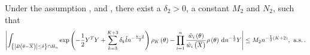 \begin{lem}
\label{lem:central-expansion-post-prod}%
\begin{comment}
need change the subscript of N, M, C
\end{comment}
Under the assumption , 
and , there exist a $\delta_{2}>0$, a constant
$M_{2}$ and $N_{2}$, such that 
\begin{equation}
\left|\int_{\left\{ \left|B\left(\theta-\overline{X}\right)\right|\le\delta\right\} \cap H_{n}}\exp\left(-\frac{1}{2}Y^{T}Y+\sum_{k=3}^{K+3}\delta_{k}\hat{l}n^{-\frac{k-2}{2}}\right)\rho_{K}\left(\theta\right)-\prod_{i=1}^{n}\frac{\hat{w}_{i}\left(\theta\right)}{\hat{w}_{i}\left(\overline{X}\right)}\rho\left(\theta\right)\,\mathrm{d} n^{-\frac{1}{2}}Y\right|\le M_{2}n^{-\frac{1}{2}\left(K+2\right)},\:\,\mathrm{a.s.}\,.\label{eq:central-exp-post}
\end{equation}
\end{lem}
